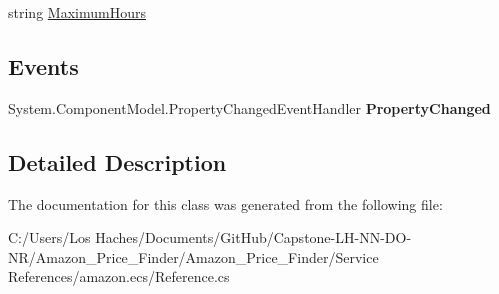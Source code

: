 \begin{DoxyCompactItemize}
\begin{DoxyCompactList}\small\item\em \end{DoxyCompactList}\item 
\hypertarget{class_amazon___price___finder_1_1amazon_1_1ecs_1_1_offer_listing_availability_attributes_a5cddc4ac7a0e505031ae771742b8d230}{string \hyperlink{class_amazon___price___finder_1_1amazon_1_1ecs_1_1_offer_listing_availability_attributes_a5cddc4ac7a0e505031ae771742b8d230}{Maximum\-Hours}}\label{class_amazon___price___finder_1_1amazon_1_1ecs_1_1_offer_listing_availability_attributes_a5cddc4ac7a0e505031ae771742b8d230}

\begin{DoxyCompactList}\small\item\em \end{DoxyCompactList}\end{DoxyCompactItemize}
\subsection*{Events}
\begin{DoxyCompactItemize}
\item 
\hypertarget{class_amazon___price___finder_1_1amazon_1_1ecs_1_1_offer_listing_availability_attributes_ace331681fc4b8221a165597fac4889f2}{System.\-Component\-Model.\-Property\-Changed\-Event\-Handler {\bfseries Property\-Changed}}\label{class_amazon___price___finder_1_1amazon_1_1ecs_1_1_offer_listing_availability_attributes_ace331681fc4b8221a165597fac4889f2}

\end{DoxyCompactItemize}


\subsection{Detailed Description}


The documentation for this class was generated from the following file\-:\begin{DoxyCompactItemize}
\item 
C\-:/\-Users/\-Los Haches/\-Documents/\-Git\-Hub/\-Capstone-\/\-L\-H-\/\-N\-N-\/\-D\-O-\/\-N\-R/\-Amazon\-\_\-\-Price\-\_\-\-Finder/\-Amazon\-\_\-\-Price\-\_\-\-Finder/\-Service References/amazon.\-ecs/Reference.\-cs\end{DoxyCompactItemize}
